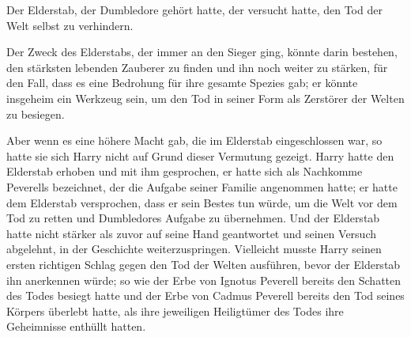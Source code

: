 Der Elderstab, der Dumbledore gehört hatte, der versucht hatte, den Tod der Welt selbst zu verhindern.

Der Zweck des Elderstabs, der immer an den Sieger ging, könnte darin bestehen, den stärksten lebenden Zauberer zu finden und ihn noch weiter zu stärken, für den Fall, dass es eine Bedrohung für ihre gesamte Spezies gab; er könnte insgeheim ein Werkzeug sein, um den Tod in seiner Form als Zerstörer der Welten zu besiegen.

Aber wenn es eine höhere Macht gab, die im Elderstab eingeschlossen war, so hatte sie sich Harry nicht auf Grund dieser Vermutung gezeigt. Harry hatte den Elderstab erhoben und mit ihm gesprochen, er hatte sich als Nachkomme Peverells bezeichnet, der die Aufgabe seiner Familie angenommen hatte; er hatte dem Elderstab versprochen, dass er sein Bestes tun würde, um die Welt vor dem Tod zu retten und Dumbledores Aufgabe zu übernehmen. Und der Elderstab hatte nicht stärker als zuvor auf seine Hand geantwortet und seinen Versuch abgelehnt, in der Geschichte weiterzuspringen. Vielleicht musste Harry seinen ersten richtigen Schlag gegen den Tod der Welten ausführen, bevor der Elderstab ihn anerkennen würde; so wie der Erbe von Ignotus Peverell bereits den Schatten des Todes besiegt hatte und der Erbe von Cadmus Peverell bereits den Tod seines Körpers überlebt hatte, als ihre jeweiligen Heiligtümer des Todes ihre Geheimnisse enthüllt hatten.

